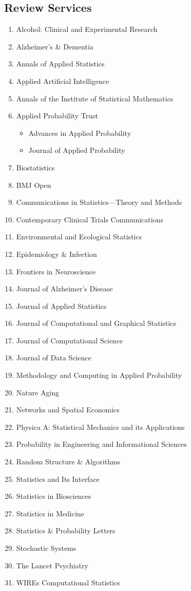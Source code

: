 \documentclass[12pt]{article}
\begin{document}
	\subsection*{Review Services}
	\begin{enumerate}
		\item Alcohol: Clinical and Experimental Research
		\item Alzheimer's \& Dementia
		\item Annals of Applied Statistics
		\item Applied Artificial Intelligence
		\item Annals of the Institute of Statistical Mathematics
		\item Applied Probability Trust
		\begin{itemize}
			\item Advances in Applied Probability 
			\item Journal of Applied Probability
		\end{itemize}
		\item Biostatistics
		\item BMJ Open
		\item Communications in Statistics---Theory and Methods
		\item Contemporary Clinical Trials Communications
		\item Environmental and Ecological Statistics
		\item Epidemiology \& Infection
		\item Frontiers in Neuroscience
		\item Journal of Alzheimer's Disease
		\item Journal of Applied Statistics
		\item Journal of Computational and Graphical Statistics 
		\item Journal of Computational Science
		\item Journal of Data Science
		\item Methodology and Computing in Applied Probability
		\item Nature Aging
		\item Networks and Spatial Economics
		\item Physica A: Statistical Mechanics and its Applications
		\item Probability in Engineering and Informational Sciences
		\item Random Structure \& Algorithms
		\item Statistics and Its Interface
		\item Statistics in Biosciences
		\item Statistics in Medicine
		\item Statistics \& Probability Letters
		\item Stochastic Systems
		\item The Lancet Psychiatry 
		\item WIREs Computational Statistics
	\end{enumerate}
	
\end{document}
